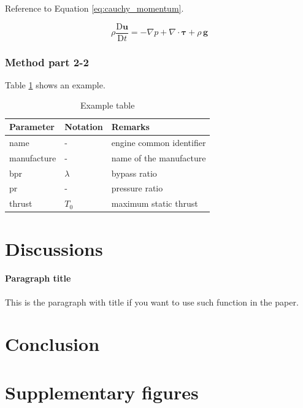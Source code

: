 \documentclass[
  manuscript=article,  %
  layout=preprint,  %
  year=20xx,
  volume=x,
]{extra/joas}
\begin{document}
\blindtext Reference to Equation \ref{eq:cauchy_momentum}.

\begin{equation} \label{eq:cauchy_momentum}
\rho\frac{\mathrm{D} \mathbf{u}}{\mathrm{D} t} = - \nabla p + \nabla \cdot \boldsymbol \tau + \rho\,\mathbf{g}
\end{equation}


\subsubsection{Method part 2-2}

\blindtext Table \ref{tb:example_table} shows an example.

\begin{table}[H]
  \centering
  \small
  \caption{Example table}
  \label{tb:example_table}
  \begin{tabular}{lll}
  \toprule
  \textbf{Parameter} & \textbf{Notation} & \textbf{Remarks} \\
  \midrule
  name & - & engine common identifier \\
  manufacture & - & name of the manufacture  \\
  bpr & $\lambda$ & bypass ratio \\
  pr & - & pressure ratio \\
  thrust & $T_0$ & maximum static thrust\\
  \bottomrule
  \end{tabular}
\end{table}

\blindtext


\section{Discussions}

\paragraph{Paragraph title} This is the paragraph with title if you want to use such function in the paper. \blindtext


\section{Conclusion}

\blindtext


\appendix

\section{Supplementary figures}
\blindtext
\end{document}
